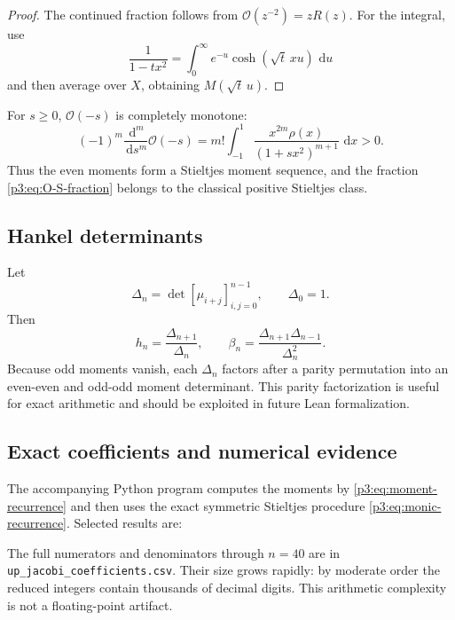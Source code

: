 \documentclass[11pt]{article}
\theoremstyle{definition}
\theoremstyle{remark}
\newcommand{\dd}{\,\mathrm d}
\newcommand{\cO}{\mathcal O}
\begin{document}
\begin{proof}
The continued fraction follows from \(\cO(z^{-2})=zR(z)\).  For the integral, use
\[
 \frac1{1-tx^2}=\int_0^{\infty}e^{-u}\cosh(\sqrt t\,xu)\,\dd u
\]
and then average over \(X\), obtaining \(M(\sqrt t\,u)\).
\end{proof}

For \(s\ge0\), \(\cO(-s)\) is completely monotone:
\begin{equation}
 (-1)^m\frac{\dd^m}{\dd s^m}\cO(-s)
 =m!\int_{-1}^{1}\frac{x^{2m}\rho(x)}{(1+sx^2)^{m+1}}\,\dd x>0. \label{p3:eq:O-complete-monotone}
\end{equation}
Thus the even moments form a Stieltjes moment sequence, and the fraction
\eqref{p3:eq:O-S-fraction} belongs to the classical positive Stieltjes class.

\subsection{Hankel determinants}

Let
\begin{equation}
 \Delta_n=\det[\mu_{i+j}]_{i,j=0}^{n-1},\qquad \Delta_0=1.  \label{p3:eq:Hankel}
\end{equation}
Then
\begin{equation}
 h_n=\frac{\Delta_{n+1}}{\Delta_n},
 \qquad
 \boxed{\beta_n=\frac{\Delta_{n+1}\Delta_{n-1}}{\Delta_n^2}}. \label{p3:eq:beta-Hankel}
\end{equation}
Because odd moments vanish, each \(\Delta_n\) factors after a parity permutation into an
even-even and odd-odd moment determinant.  This parity factorization is useful for exact
arithmetic and should be exploited in future Lean formalization.

\subsection{Exact coefficients and numerical evidence}

The accompanying Python program computes the moments by
\eqref{p3:eq:moment-recurrence} and then uses the exact symmetric Stieltjes procedure
\eqref{p3:eq:monic-recurrence}.  Selected results are:

\begin{center}

\end{center}

The full numerators and denominators through \(n=40\) are in
\texttt{up\_jacobi\_coefficients.csv}.  Their size grows rapidly: by moderate order the
reduced integers contain thousands of decimal digits.  This arithmetic complexity is not a
floating-point artifact.
\end{document}
